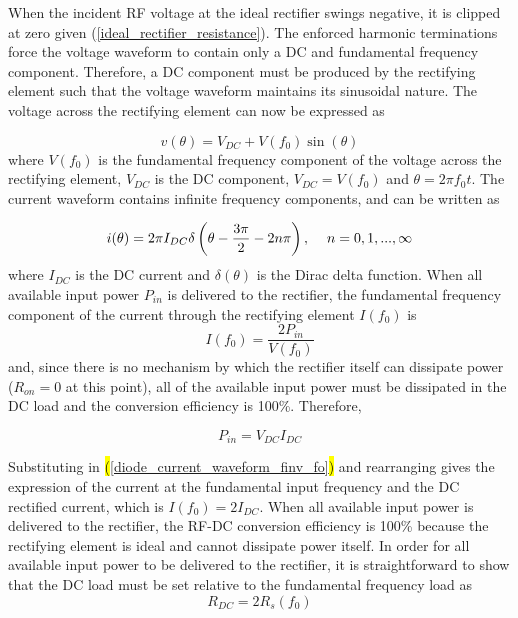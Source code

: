 \documentclass[journal]{IEEEtran}
\begin{document}
When the incident RF voltage at the ideal rectifier swings negative, it is clipped at zero given (\ref{ideal_rectifier_resistance}).  The enforced harmonic terminations force the voltage waveform to contain only a DC and fundamental frequency component. Therefore, a DC component must be produced by the rectifying element such that the voltage waveform maintains its sinusoidal nature.  The voltage across the rectifying element can now be expressed as

\begin{equation}\label{diode_voltage_waveform_B}
    v(\theta) = V_{DC} + V(f_0)\sin(\theta)
\end{equation}
where $V(f_0)$ is the fundamental frequency component of the voltage across the rectifying element, $V_{DC}$ is the DC component, $V_{DC} = V(f_0)$ and $\theta = 2\pi f_0 t$. The current waveform contains infinite frequency components, and can be written as

\begin{equation}\label{diode_current_waveform_time_domain}
    i(\theta) = 2\pi I_{DC}\delta\left(\theta-\frac{3\pi}{2} - 2n\pi\right), \hskip 1pc n = 0,1,...,\infty
\end{equation}
where $I_{DC}$ is the DC current and $\delta(\theta)$ is the Dirac delta function. When all available input power $P_{in}$ is delivered to the rectifier, the fundamental frequency component of the current through the rectifying element $I(f_0)$ is
\begin{equation}\label{diode_current_waveform_finv_fo}
I(f_0) = \frac{2P_{in}}{V(f_0)}
\end{equation}
and, since there is no mechanism by which the rectifier itself can dissipate power ($R_{on}=0$ at this point), all of the available input power must be dissipated in the DC load and the conversion efficiency is 100\%. Therefore,

\begin{equation}\label{dcload}
P_{in} = V_{DC}I_{DC}
\end{equation}

Substituting in \hl{(}\ref{diode_current_waveform_finv_fo}\hl{)} and rearranging gives the expression of the current at the fundamental input frequency and the DC rectified current, which is $I(f_0) = 2I_{DC}$. When all available input power is delivered to the rectifier, the RF-DC conversion efficiency is 100\% because the rectifying element is ideal and cannot dissipate power itself.  In order for all available input power to be delivered to the rectifier, it is straightforward to show that the DC load must be set relative to the fundamental frequency load as
\begin{equation}\label{ideal_DC_load}
R_{DC} = 2R_s(f_0)
\end{equation}
\end{document}
